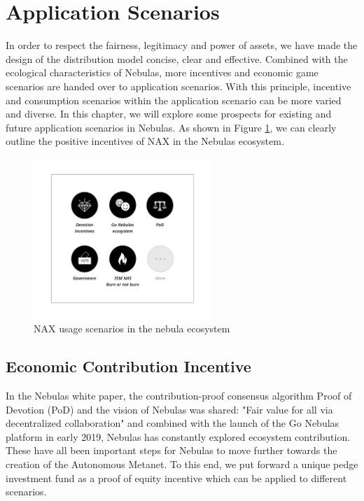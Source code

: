 \section{Application Scenarios}
In order to respect the fairness, legitimacy and power of assets, we have made the design of the distribution model concise, clear and effective. Combined with the ecological characteristics of Nebulas, more incentives and economic game scenarios are handed over to application scenarios. With this principle, incentive and consumption scenarios within the application scenario can be more varied and diverse. In this chapter, we will explore some prospects for existing and future application scenarios in Nebulas. As shown in Figure \ref{fig:nax_ecosys}, we can clearly outline the positive incentives of NAX in the Nebulas ecosystem.

\begin{figure}[h]
  \centering
  \includegraphics[width=0.6\textwidth]{../common/usecases.pdf}
  \caption{NAX usage scenarios in the nebula ecosystem\label{fig:nax_ecosys}}
\end{figure}

\subsection{Economic Contribution Incentive}
In the Nebulas white paper, the contribution-proof consensus algorithm Proof of Devotion (PoD) and the vision of Nebulas was shared: "Fair value for all via decentralized collaboration" and combined with the launch of the Go Nebulas platform in early 2019, Nebulas has constantly explored ecosystem contribution. These have all been important steps for Nebulas to move further towards the creation of the Autonomous Metanet. To this end, we put forward a unique pedge investment fund as a proof of equity incentive which can be applied to different scenarios.

